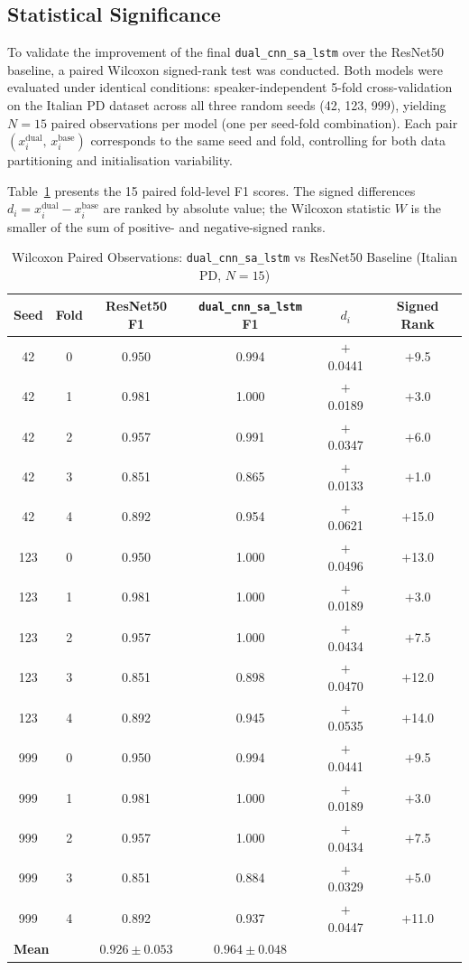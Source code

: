 \documentclass[oneside,openany]{final_report}
\newcommand{\dualcnn}{\texttt{dual\_cnn\_sa\_lstm}}
\begin{document}
\subsection{Statistical Significance}
\label{subsec:wilcoxon}

To validate the improvement of the final \dualcnn{} over the ResNet50 baseline, a paired Wilcoxon signed-rank test was conducted. Both models were evaluated under identical conditions: speaker-independent 5-fold cross-validation on the Italian PD dataset across all three random seeds (42, 123, 999), yielding $N\!=\!15$ paired observations per model (one per seed-fold combination). Each pair $(x_i^{\text{dual}},\, x_i^{\text{base}})$ corresponds to the same seed and fold, controlling for both data partitioning and initialisation variability.

Table~\ref{tab:wilcoxon_pairs} presents the 15 paired fold-level F1 scores. The signed differences $d_i = x_i^{\text{dual}} - x_i^{\text{base}}$ are ranked by absolute value; the Wilcoxon statistic $W$ is the smaller of the sum of positive- and negative-signed ranks.

\begin{table}[H]
\centering
\caption{Wilcoxon Paired Observations: \dualcnn{} vs ResNet50 Baseline (Italian PD, $N\!=\!15$)}
\label{tab:wilcoxon_pairs}
\small
\begin{tabular}{c c c c c c}
\toprule
\textbf{Seed} & \textbf{Fold} & \textbf{ResNet50 F1} & \textbf{\dualcnn{} F1} & \textbf{$d_i$} & \textbf{Signed Rank} \\
\midrule
42  & 0 & 0.950 & 0.994 & $+$0.0441 & $+$9.5 \\
42  & 1 & 0.981 & 1.000 & $+$0.0189 & $+$3.0 \\
42  & 2 & 0.957 & 0.991 & $+$0.0347 & $+$6.0 \\
42  & 3 & 0.851 & 0.865 & $+$0.0133 & $+$1.0 \\
42  & 4 & 0.892 & 0.954 & $+$0.0621 & $+$15.0 \\
123 & 0 & 0.950 & 1.000 & $+$0.0496 & $+$13.0 \\
123 & 1 & 0.981 & 1.000 & $+$0.0189 & $+$3.0 \\
123 & 2 & 0.957 & 1.000 & $+$0.0434 & $+$7.5 \\
123 & 3 & 0.851 & 0.898 & $+$0.0470 & $+$12.0 \\
123 & 4 & 0.892 & 0.945 & $+$0.0535 & $+$14.0 \\
999 & 0 & 0.950 & 0.994 & $+$0.0441 & $+$9.5 \\
999 & 1 & 0.981 & 1.000 & $+$0.0189 & $+$3.0 \\
999 & 2 & 0.957 & 1.000 & $+$0.0434 & $+$7.5 \\
999 & 3 & 0.851 & 0.884 & $+$0.0329 & $+$5.0 \\
999 & 4 & 0.892 & 0.937 & $+$0.0447 & $+$11.0 \\
\midrule
\multicolumn{2}{l}{\textbf{Mean}} & $0.926 \pm 0.053$ & $\mathbf{0.964 \pm 0.048}$ & & \\
\bottomrule
\end{tabular}
\end{table}
\end{document}
